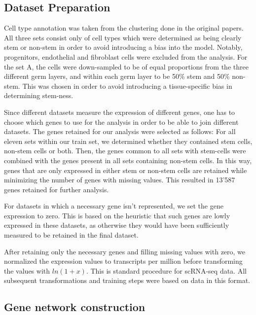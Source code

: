 \documentclass[10pt,conference,compsocconf]{IEEEtran}
\begin{document}
\subsection{Dataset Preparation}
Cell type annotation was taken from the clustering done in the original papers. All three sets consist only of cell types which were determined as being clearly stem or non-stem in order to avoid introducing a bias into the model. Notably, progenitors, endothelial and fibroblast cells were excluded from the analysis. For the set A, the cells were down-sampled to be of equal proportions from the three different germ layers, and within each germ layer to be 50\% stem and 50\% non-stem. This was chosen in order to avoid introducing a tissue-specific bias in determining stem-ness. 
\par
Since different datasets measure the expression of different genes, one has to choose which genes to use for the analysis in order to be able to join different datasets. The genes retained for our analysis were selected as follows: For all eleven sets within our train set, we determined whether they contained stem cells, non-stem cells or both. Then, the genes common to all sets with stem-cells were combined with the genes present in all sets containing non-stem cells. In this way, genes that are only expressed in either stem or non-stem cells are retained while minimizing the number of genes with missing values. This resulted in 13'587 genes retained for further analysis.
\par
For datasets in which a necessary gene isn't represented, we set the gene expression to zero. This is based on the heuristic that such genes are lowly expressed in these datasets, as otherwise they would have been sufficiently measured to be retained in the final dataset. 
\par
After retaining only the necessary genes and filling missing values with zero, we normalized the expression values to transcripts per million before transforming the values with $ln(1+x)$. This is standard procedure for scRNA-seq data. All subsequent transformations and training steps were based on data in this format. 

\subsection{Gene network construction}
\end{document}
